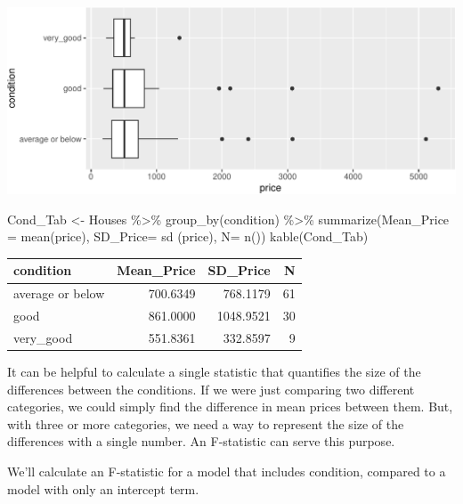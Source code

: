 \documentclass[
  letterpaper,
  DIV=11,
  numbers=noendperiod]{scrreprt}
\newenvironment{Shaded}{\begin{snugshade}}{\end{snugshade}}
\newcommand{\AttributeTok}[1]{\textcolor[rgb]{0.40,0.45,0.13}{#1}}
\newcommand{\FunctionTok}[1]{\textcolor[rgb]{0.28,0.35,0.67}{#1}}
\newcommand{\NormalTok}[1]{\textcolor[rgb]{0.00,0.23,0.31}{#1}}
\newcommand{\OtherTok}[1]{\textcolor[rgb]{0.00,0.23,0.31}{#1}}
\newcommand{\SpecialCharTok}[1]{\textcolor[rgb]{0.37,0.37,0.37}{#1}}
\begin{document}
\includegraphics{Ch2_files/figure-pdf/unnamed-chunk-61-1.pdf}

\begin{Shaded}
\begin{Highlighting}[]
\NormalTok{Cond\_Tab }\OtherTok{\textless{}{-}}\NormalTok{ Houses }\SpecialCharTok{\%\textgreater{}\%} \FunctionTok{group\_by}\NormalTok{(condition) }\SpecialCharTok{\%\textgreater{}\%} \FunctionTok{summarize}\NormalTok{(}\AttributeTok{Mean\_Price =} \FunctionTok{mean}\NormalTok{(price), }
                                             \AttributeTok{SD\_Price=} \FunctionTok{sd}\NormalTok{ (price), }
                                             \AttributeTok{N=} \FunctionTok{n}\NormalTok{())}
\FunctionTok{kable}\NormalTok{(Cond\_Tab)}
\end{Highlighting}
\end{Shaded}

\begin{longtable}[]{@{}lrrr@{}}
\toprule\noalign{}
condition & Mean\_Price & SD\_Price & N \\
\midrule\noalign{}
\endhead
\bottomrule\noalign{}
\endlastfoot
average or below & 700.6349 & 768.1179 & 61 \\
good & 861.0000 & 1048.9521 & 30 \\
very\_good & 551.8361 & 332.8597 & 9 \\
\end{longtable}

It can be helpful to calculate a single statistic that quantifies the
size of the differences between the conditions. If we were just
comparing two different categories, we could simply find the difference
in mean prices between them. But, with three or more categories, we need
a way to represent the size of the differences with a single number. An
F-statistic can serve this purpose.

We'll calculate an F-statistic for a model that includes condition,
compared to a model with only an intercept term.
\end{document}
